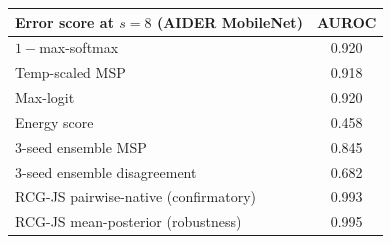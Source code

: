 \begin{tabular}{lc}
\toprule
Error score at $s{=}8$ (AIDER MobileNet) & AUROC \\
\midrule
$1{-}$max-softmax & 0.920 \\
Temp-scaled MSP & 0.918 \\
Max-logit & 0.920 \\
Energy score & 0.458 \\
3-seed ensemble MSP & 0.845 \\
3-seed ensemble disagreement & 0.682 \\
RCG-JS pairwise-native (confirmatory) & 0.993 \\
RCG-JS mean-posterior (robustness) & 0.995 \\
\bottomrule
\end{tabular}
